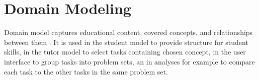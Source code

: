 

\section{Domain Modeling}
\label{sec:domain-modeling}

Domain model captures educational content, covered concepts, and relationships
between them
\cite{its-domain-models}.
It is used in the student model to provide structure
for student skills, in the tutor model to select tasks containing chosen
concept, in the user interface to group tasks into problem sets, an in
analyses for example to compare each task to the other tasks in the same problem set.

